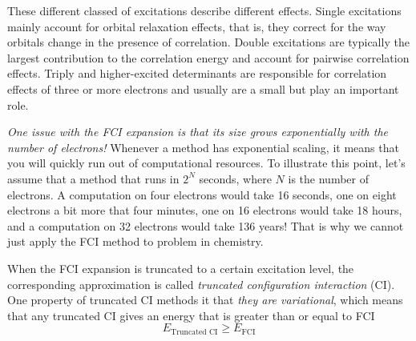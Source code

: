 \documentclass[../Main/chem371-notes.tex]{subfiles}
\begin{document}

These different classed of excitations describe different effects.
Single excitations mainly account for orbital relaxation effects, that is, they correct for the way orbitals change in the presence of correlation.
Double excitations are typically the largest contribution to the correlation energy and account for pairwise correlation effects.
Triply and higher-excited determinants are responsible for correlation effects of three or more electrons and usually are a small but play an important role.


\emph{One issue with the FCI expansion is that its size grows exponentially with the number of electrons!}
Whenever a method has exponential scaling, it means that you will quickly run out of computational resources.
To illustrate this point, let's assume that a method that runs in $2^N$ seconds, where $N$ is the number of electrons.
A computation on four electrons would take 16 seconds, one on eight electrons a bit more that four minutes, one on 16 electrons would take 18 hours, and a computation on 32 electrons would take 136 years!
That is why we cannot just apply the FCI method to problem in chemistry.


When the FCI expansion is truncated to a certain excitation level, the corresponding approximation is called \emph{truncated configuration interaction} (CI).
One property of truncated CI methods it that \emph{they are variational}, which means that any truncated CI gives an energy that is greater than or equal to FCI
\begin{equation}
E_\text{Truncated CI} \geq E_\text{FCI}
\end{equation}
\end{document}
